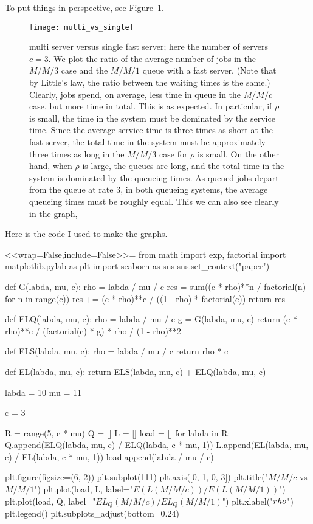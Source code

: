 \begin{question}
\begin{solution}
\begin{enumerate}
To put things in perspective, see Figure~\ref{fig:multisingle}. 
\begin{figure}[h]
  \centering
\texttt{[image: multi\_vs\_single]}
  \caption{multi server versus single fast server; here the number of
    servers $c=3$. We plot the ratio of the average number of jobs in
    the $M/M/3$ case and the $M/M/1$ queue with a fast server. (Note
    that by Little's law, the ratio between the waiting times is the
    same.) Clearly, jobs spend, on average, less time in queue in the
    $M/M/c$ case, but more time in total. This is as expected. In
    particular, if $\rho$ is small, the time in the system must be
    dominated by the service time. Since the average service time is
    three times as short at the fast server, the total time in the
    system must be approximately three times as long in the $M/M/3$
    case for $\rho$ is small. On the other hand, when $\rho$ is large,
    the queues are long, and the total time in the system is dominated
    by the queueing times.  As queued jobs depart from the queue at
    rate $3$, in both queueing systems, the average queueing times
    must be roughly equal. This we can also see clearly in the graph,}
  \label{fig:multisingle}
\end{figure}

Here is the code I used to make the graphs.

<<wrap=False,include=False>>=
from math import exp, factorial
import matplotlib.pylab as plt
import seaborn as sns
sns.set_context("paper")


def G(labda, mu, c):
    rho = labda / mu / c
    res = sum((c * rho)**n / factorial(n) for n in range(c))
    res += (c * rho)**c / ((1 - rho) * factorial(c))
    return res


def ELQ(labda, mu, c):
    rho = labda / mu / c
    g = G(labda, mu, c)
    return (c * rho)**c / (factorial(c) * g) * rho / (1 - rho)**2


def ELS(labda, mu, c):
    rho = labda / mu / c
    return rho * c


def EL(labda, mu, c):
    return ELS(labda, mu, c) + ELQ(labda, mu, c)


labda = 10
mu = 11

c = 3

R = range(5, c * mu)
Q = []
L = []
load = []
for labda in R:
    Q.append(ELQ(labda, mu, c) / ELQ(labda, c * mu, 1))
    L.append(EL(labda, mu, c) / EL(labda, c * mu, 1))
    load.append(labda / mu / c)

plt.figure(figsize=(6, 2))
plt.subplot(111)
plt.axis([0, 1, 0, 3])
plt.title("$M/M/c$ vs $M/M/1$")
plt.plot(load, L, label="$E(L(M/M/c))/E(L(M/M/1))$")
plt.plot(load, Q, label="$EL_Q(M/M/c)/EL_Q(M/M/1)$")
plt.xlabel("$\\rho$")
plt.legend()
plt.subplots_adjust(bottom=0.24)


\end{enumerate}
\end{solution}
\end{question}
